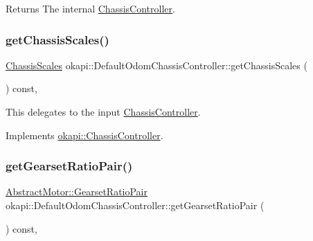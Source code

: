 \begin{DoxyReturn}{Returns}
The internal \mbox{\hyperlink{classokapi_1_1ChassisController}{Chassis\+Controller}}. 
\end{DoxyReturn}
\mbox{\label{classokapi_1_1DefaultOdomChassisController_afa07913b30d47c790fcdce8c2b85a468}} 
\subsubsection{\texorpdfstring{getChassisScales()}{getChassisScales()}}
{\footnotesize\ttfamily \mbox{\hyperlink{classokapi_1_1ChassisScales}{Chassis\+Scales}} okapi\+::\+Default\+Odom\+Chassis\+Controller\+::get\+Chassis\+Scales (\begin{DoxyParamCaption}{ }\end{DoxyParamCaption}) const\hspace{0.3cm}{\ttfamily [override]}, {\ttfamily [virtual]}}

This delegates to the input \mbox{\hyperlink{classokapi_1_1ChassisController}{Chassis\+Controller}}. 

Implements \mbox{\hyperlink{classokapi_1_1ChassisController_a0a8e32fc7adad8567f550954505aaa06}{okapi\+::\+Chassis\+Controller}}.

\mbox{\label{classokapi_1_1DefaultOdomChassisController_a6912dbe99776f79fb3a6990e2fbea2ff}} 
\subsubsection{\texorpdfstring{getGearsetRatioPair()}{getGearsetRatioPair()}}
{\footnotesize\ttfamily \mbox{\hyperlink{structokapi_1_1AbstractMotor_1_1GearsetRatioPair}{Abstract\+Motor\+::\+Gearset\+Ratio\+Pair}} okapi\+::\+Default\+Odom\+Chassis\+Controller\+::get\+Gearset\+Ratio\+Pair (\begin{DoxyParamCaption}{ }\end{DoxyParamCaption}) const\hspace{0.3cm}{\ttfamily [override]}, {\ttfamily [virtual]}}

